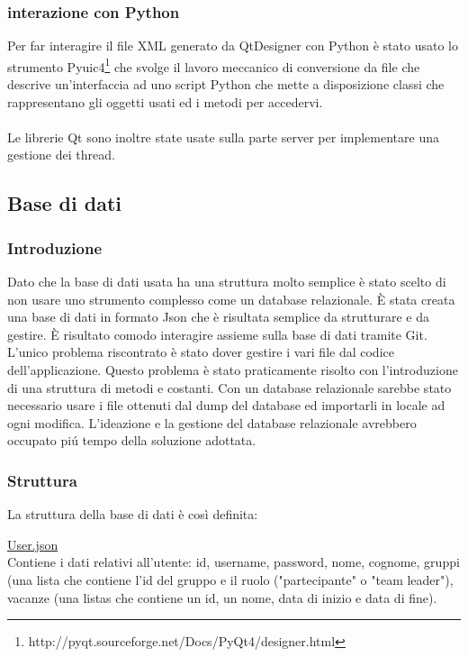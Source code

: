 \documentclass[12pt]{scrartcl}
\begin{document}
\subsubsection{interazione con Python}
Per far interagire il file XML generato da QtDesigner con Python
\`e stato usato lo strumento Pyuic4\footnote{http://pyqt.sourceforge.net/Docs/PyQt4/designer.html}
che svolge il lavoro meccanico di conversione da file che descrive un'interfaccia
ad uno script Python che mette a disposizione classi che rappresentano
gli oggetti usati ed i metodi  per accedervi. \\ \\
Le librerie Qt sono inoltre state usate sulla parte server per implementare una
gestione dei thread.

\subsection{Base di dati}
\subsubsection{Introduzione}
    Dato che la base di dati usata ha una struttura molto semplice \`e stato scelto
    di non usare uno strumento complesso come un database relazionale. 
    \`E stata creata una base di dati in formato Json che \`e risultata semplice da
    strutturare e da gestire. \`E risultato comodo interagire assieme sulla base
    di dati tramite Git. L'unico problema riscontrato \`e stato dover gestire i vari
    file dal codice dell'applicazione. Questo problema \`e stato praticamente risolto
    con l'introduzione di una struttura di metodi e costanti.
    Con un database relazionale sarebbe stato necessario usare
    i file ottenuti dal dump del database ed importarli in locale ad ogni modifica.
    L'ideazione e la gestione del database relazionale avrebbero occupato pi\'u tempo
    della soluzione adottata.
\subsubsection{Struttura}
    La struttura della base di dati \`e cos\`i definita:
    
    
        \underline{User.json}\\
        Contiene i dati relativi all'utente: id, username, password, nome, cognome, gruppi (una lista che
        contiene l'id del gruppo e il ruolo ("partecipante" o "team leader"), vacanze (una listas che
        contiene un id, un nome, data di inizio e data di fine).\\
    
\end{document}
